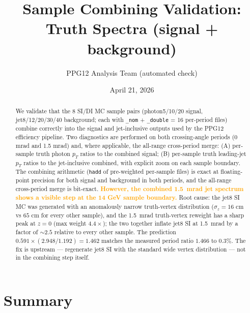 \documentclass[11pt,a4paper]{article}
\title{Sample Combining Validation: Truth \pT{} Spectra (signal + background)}
\author{PPG12 Analysis Team (automated check)}
\date{April 21, 2026}
\newcommand{\pT}{$p_T$}
\newcommand{\warn}[1]{\textcolor{orange}{\textbf{#1}}}
\begin{document}
\maketitle

\begin{abstract}
\noindent
We validate that the 8 SI/DI MC sample pairs (photon5/10/20 signal, jet8/12/20/30/40 background; each with \texttt{\_nom} + \texttt{\_double} = 16 per-period files) combine correctly into the signal and jet-inclusive outputs used by the PPG12 efficiency pipeline. Two diagnostics are performed on both crossing-angle periods (0 mrad and 1.5 mrad) and, where applicable, the all-range cross-period merge: (A) per-sample truth photon \pT{} ratios to the combined signal; (B) per-sample truth leading-jet \pT{} ratios to the jet-inclusive combined, with explicit zoom on each sample boundary. The combining arithmetic (\texttt{hadd} of pre-weighted per-sample files) is exact at floating-point precision for both signal and background in both periods, and the all-range cross-period merge is bit-exact. \warn{However, the combined 1.5~mrad jet spectrum shows a visible step at the 14 GeV sample boundary.} Root cause: the jet8 SI MC was generated with an anomalously narrow truth-vertex distribution ($\sigma_z = 16$ cm vs $65$ cm for every other sample), and the 1.5~mrad truth-vertex reweight has a sharp peak at $z=0$ (max weight $4.4\times$); the two together inflate jet8 SI at 1.5~mrad by a factor of $\sim 2.5$ relative to every other sample. The prediction $0.591 \times (2.948/1.192) = 1.462$ matches the measured period ratio $1.466$ to 0.3\%. The fix is upstream --- regenerate jet8 SI with the standard wide vertex distribution --- not in the combining step itself.
\end{abstract}

\section{Summary}
\end{document}
